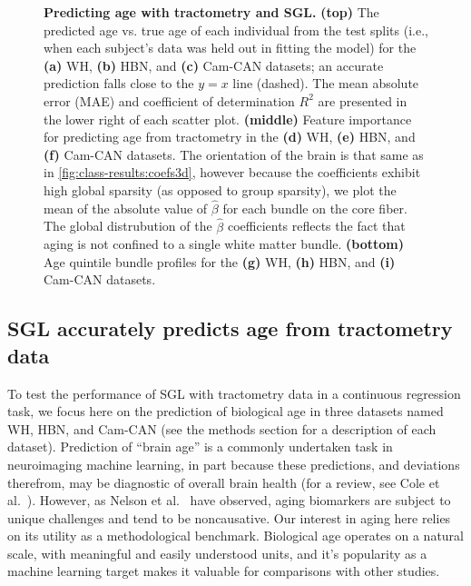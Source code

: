 \documentclass[10pt,letterpaper]{article}
\begin{document}
\begin{figure}
    {\label{fig:age-results:wh-coefs3d}}
    {\label{fig:age-results:hbn-coefs3d}}
    {\label{fig:age-results:cc-coefs3d}}
    {\label{fig:age-results:wh-profile}}
    {\label{fig:age-results:hbn-profile}}
    {\label{fig:age-results:cc-profile}}
    \caption{%
        {\bf Predicting age with tractometry and SGL.}
        \label{fig:age-results}
        {\bf (top)} The predicted age vs. true age of each individual from the test
        splits (i.e., when each subject's data was held out in fitting the
        model) for the {\bf (a)} WH, {\bf (b)} HBN, and {\bf (c)} Cam-CAN
        datasets; an accurate prediction falls close to the $y=x$ line
        (dashed). The mean absolute error (MAE) and coefficient of
        determination $R^2$ are presented in the lower right of each scatter
        plot.
        {\bf (middle)} Feature importance for predicting age from tractometry in
        the {\bf (d)} WH, {\bf (e)} HBN, and {\bf (f)} Cam-CAN datasets.
        The orientation of the
        brain is that same as in \cref{fig:class-results:coefs3d}, however because
        the coefficients exhibit high global sparsity (as opposed to group
        sparsity), we plot the mean of the absolute value of $\hat{\beta}$
        for each bundle on the core fiber. The global distrubution of the
        $\hat{\beta}$ coefficients reflects the fact that aging is not
        confined to a single white matter bundle.
        {\bf (bottom)} Age quintile bundle profiles for the {\bf (g)} WH,
        {\bf (h)} HBN, and {\bf (i)} Cam-CAN datasets.
    }
\end{figure}

\subsection*{SGL accurately predicts age from tractometry data}

To test the performance of SGL with tractometry data in a continuous
regression task, we focus here on the prediction of biological age in three
datasets named WH, HBN, and Cam-CAN (see the methods section for a description of each dataset). Prediction of ``brain
age'' is a commonly undertaken task in neuroimaging machine learning, in part
because these predictions, and deviations therefrom, may be diagnostic of
overall brain health (for a review, see Cole et al.~\cite{Cole2019-rz}).
However, as Nelson et al.~\cite{nelson2019biomarkers} have observed, aging
biomarkers are subject to unique challenges and tend to be noncausative. Our
interest in aging here relies on its utility as a methodological benchmark.
Biological age operates on a natural scale, with meaningful and easily
understood units, and it's popularity as a machine learning target makes it
valuable for comparisons with other studies.
\end{document}
